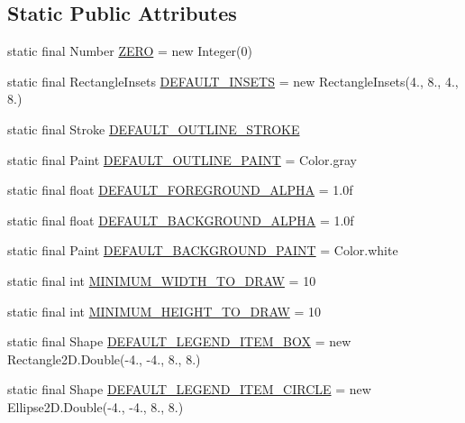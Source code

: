 \subsection*{Static Public Attributes}
\begin{DoxyCompactItemize}
\item 
static final Number \mbox{\hyperlink{classorg_1_1jfree_1_1chart_1_1plot_1_1_plot_acf5c7736aa5a5e494ef7518dcb8d2555}{Z\+E\+RO}} = new Integer(0)
\item 
static final Rectangle\+Insets \mbox{\hyperlink{classorg_1_1jfree_1_1chart_1_1plot_1_1_plot_abe6011cbfe8406cf3e8736fc508e28ab}{D\+E\+F\+A\+U\+L\+T\+\_\+\+I\+N\+S\+E\+TS}} = new Rectangle\+Insets(4., 8., 4., 8.)
\item 
static final Stroke \mbox{\hyperlink{classorg_1_1jfree_1_1chart_1_1plot_1_1_plot_a90d5f787b815091622d86482bbcae0ac}{D\+E\+F\+A\+U\+L\+T\+\_\+\+O\+U\+T\+L\+I\+N\+E\+\_\+\+S\+T\+R\+O\+KE}}
\item 
static final Paint \mbox{\hyperlink{classorg_1_1jfree_1_1chart_1_1plot_1_1_plot_a850bff823cc222c43efe30757c82e28f}{D\+E\+F\+A\+U\+L\+T\+\_\+\+O\+U\+T\+L\+I\+N\+E\+\_\+\+P\+A\+I\+NT}} = Color.\+gray
\item 
static final float \mbox{\hyperlink{classorg_1_1jfree_1_1chart_1_1plot_1_1_plot_adaf000af921e25365c3e8467373857c2}{D\+E\+F\+A\+U\+L\+T\+\_\+\+F\+O\+R\+E\+G\+R\+O\+U\+N\+D\+\_\+\+A\+L\+P\+HA}} = 1.\+0f
\item 
static final float \mbox{\hyperlink{classorg_1_1jfree_1_1chart_1_1plot_1_1_plot_a735ed21687c84cfa2ad82ec03001cac6}{D\+E\+F\+A\+U\+L\+T\+\_\+\+B\+A\+C\+K\+G\+R\+O\+U\+N\+D\+\_\+\+A\+L\+P\+HA}} = 1.\+0f
\item 
static final Paint \mbox{\hyperlink{classorg_1_1jfree_1_1chart_1_1plot_1_1_plot_a3af90a9fa38b86acd5c45f07942aa76c}{D\+E\+F\+A\+U\+L\+T\+\_\+\+B\+A\+C\+K\+G\+R\+O\+U\+N\+D\+\_\+\+P\+A\+I\+NT}} = Color.\+white
\item 
static final int \mbox{\hyperlink{classorg_1_1jfree_1_1chart_1_1plot_1_1_plot_aaf67d7c3db3c932f6d0b12f6ed86b92e}{M\+I\+N\+I\+M\+U\+M\+\_\+\+W\+I\+D\+T\+H\+\_\+\+T\+O\+\_\+\+D\+R\+AW}} = 10
\item 
static final int \mbox{\hyperlink{classorg_1_1jfree_1_1chart_1_1plot_1_1_plot_a0b15ee9d5de5fa27141a11136b6c322c}{M\+I\+N\+I\+M\+U\+M\+\_\+\+H\+E\+I\+G\+H\+T\+\_\+\+T\+O\+\_\+\+D\+R\+AW}} = 10
\item 
static final Shape \mbox{\hyperlink{classorg_1_1jfree_1_1chart_1_1plot_1_1_plot_ab5ad2640e0ee8331ffc080d3cfd95f3c}{D\+E\+F\+A\+U\+L\+T\+\_\+\+L\+E\+G\+E\+N\+D\+\_\+\+I\+T\+E\+M\+\_\+\+B\+OX}} = new Rectangle2\+D.\+Double(-\/4., -\/4., 8., 8.)
\item 
static final Shape \mbox{\hyperlink{classorg_1_1jfree_1_1chart_1_1plot_1_1_plot_acd64d63d1fcc374181a02b098036a4ce}{D\+E\+F\+A\+U\+L\+T\+\_\+\+L\+E\+G\+E\+N\+D\+\_\+\+I\+T\+E\+M\+\_\+\+C\+I\+R\+C\+LE}} = new Ellipse2\+D.\+Double(-\/4., -\/4., 8., 8.)
\end{DoxyCompactItemize}
